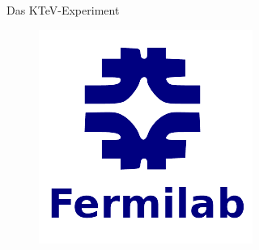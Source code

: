 \documentclass[aspectratio=1610, professionalfonts, 9pt, t]{beamer}
\begin{document}
  \begin{frame}{Das KTeV-Experiment}
    \begin{figure}
      \includegraphics[height=0.8\textheight]{Images/rip.png}
    \end{figure}
  \end{frame}
\end{document}
